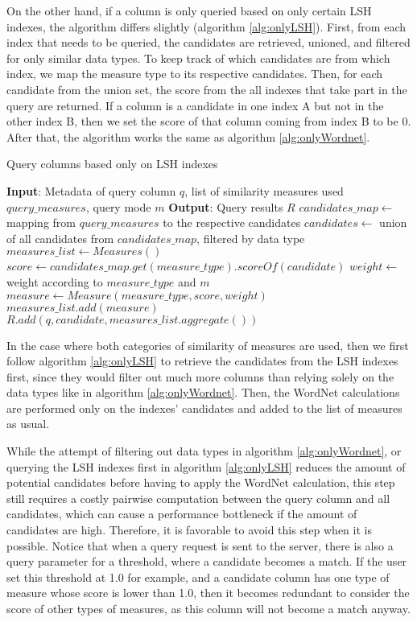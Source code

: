 On the other hand, if a column is only queried based on only certain LSH indexes, the algorithm differs slightly (algorithm \ref{alg:onlyLSH}). First, from each index that needs to be queried, the candidates are retrieved, unioned, and filtered for only similar data types. To keep track of which candidates are from which index, we map the measure type to its respective candidates. Then, for each candidate from the union set, the score from the all indexes that take part in the query are returned. If a column is a candidate in one index A but not in the other index B, then we set the score of that column coming from index B to be 0. After that, the algorithm works the same as algorithm \ref{alg:onlyWordnet}.

\begin{algorithm}
    \caption{Query columns based only on LSH indexes}
    \label{alg:onlyLSH}
    \begin{algorithmic}[1]
\STATE \textbf{Input}: Metadata of query column $q$, list of similarity measures used $query\_measures$, query mode $m$
\STATE \textbf{Output}: Query results $R$
\STATE $candidates\_map \gets$ mapping from $query\_measures$ to the respective candidates
\STATE $candidates \gets$ union of all candidates from $candidates\_map$, filtered by data type
\STATE $measures\_list \gets Measures()$
\STATE $score \gets candidates\_map.get(measure\_type).scoreOf(candidate)$
\STATE $weight \gets$ weight according to $measure\_type$ and $m$
\STATE $measure \gets Measure(measure\_type, score, weight)$
\STATE $measures\_list.add(measure)$
\ENDFOR
\STATE $R.add(q, candidate, measures\_list.aggregate())$
\ENDFOR
    \end{algorithmic}
\end{algorithm}

In the case where both categories of similarity of measures are used, then we first follow algorithm \ref{alg:onlyLSH} to retrieve the candidates from the LSH indexes first, since they would filter out much more columns than relying solely on the data types like in algorithm \ref{alg:onlyWordnet}. Then, the WordNet calculations are performed only on the indexes' candidates and added to the list of measures as usual.

While the attempt of filtering out data types in algorithm \ref{alg:onlyWordnet}, or querying the LSH indexes first in algorithm \ref{alg:onlyLSH} reduces the amount of potential candidates before having to apply the WordNet calculation, this step still requires a costly pairwise computation between the query column and all candidates, which can cause a performance bottleneck if the amount of candidates are high. Therefore, it is favorable to avoid this step when it is possible. Notice that when a query request is sent to the server, there is also a query parameter for a threshold, where a candidate becomes a match. If the user set this threshold at 1.0 for example, and a candidate column has one type of measure whose score is lower than 1.0, then it becomes redundant to consider the score of other types of measures, as this column will not become a match anyway.

